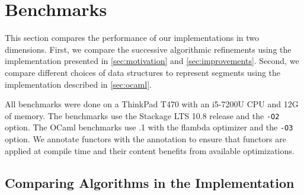 \section{Benchmarks}
\label{sec:bench}


This section compares the performance of our implementations in two dimensions.
First, we compare the successive algorithmic refinements using the \haskell
implementation presented in \cref{sec:motivation} and \cref{sec:improvements}.
Second, we compare different choices of data structures to represent segments
using the \ocaml implementation described in \cref{sec:ocaml}.

All benchmarks were done on a ThinkPad T470 with an i5-7200U CPU and 12G of memory.
The \haskell benchmarks use the Stackage LTS 10.8 release and the \texttt{-O2} option.
The OCaml benchmarks use .1 with the flambda optimizer and the
\texttt{-O3} option. We annotate functors
with the \code{[@inline]} annotation to ensure that functors are applied at
compile time and their content benefits from available optimizations.

\subsection{Comparing Algorithms in the \haskell Implementation}


